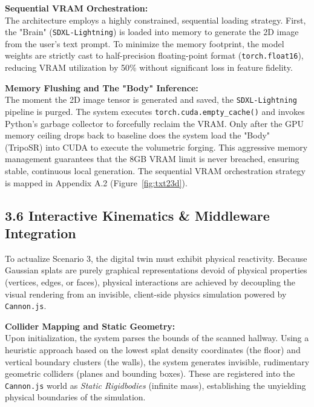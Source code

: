 \vspace{1em}
\textbf{Sequential VRAM Orchestration:} \\
The architecture employs a highly constrained, sequential loading strategy. First, the "Brain" (\texttt{SDXL-Lightning}) is loaded into memory to generate the 2D image from the user's text prompt. To minimize the memory footprint, the model weights are strictly cast to half-precision floating-point format (\texttt{torch.float16}), reducing VRAM utilization by 50\% without significant loss in feature fidelity. 

\vspace{1em}
\textbf{Memory Flushing and The "Body" Inference:} \\
The moment the 2D image tensor is generated and saved, the \texttt{SDXL-Lightning} pipeline is purged. The system executes \texttt{torch.cuda.empty\_cache()} and invokes Python's garbage collector to forcefully reclaim the VRAM. Only after the GPU memory ceiling drops back to baseline does the system load the "Body" (TripoSR) into CUDA to execute the volumetric forging. This aggressive memory management guarantees that the 8GB VRAM limit is never breached, ensuring stable, continuous local generation. The sequential VRAM orchestration strategy is mapped in Appendix A.2 (Figure~\ref{fig:txt23d}).

\vspace{0.3cm}
\subsection*{3.6 Interactive Kinematics \& Middleware Integration}
To actualize Scenario 3, the digital twin must exhibit physical reactivity. Because Gaussian splats are purely graphical representations devoid of physical properties (vertices, edges, or faces), physical interactions are achieved by decoupling the visual rendering from an invisible, client-side physics simulation powered by \texttt{Cannon.js}.

\vspace{0.2cm}
\textbf{Collider Mapping and Static Geometry:} \\
Upon initialization, the system parses the bounds of the scanned hallway. Using a heuristic approach based on the lowest splat density coordinates (the floor) and vertical boundary clusters (the walls), the system generates invisible, rudimentary geometric colliders (planes and bounding boxes). These are registered into the \texttt{Cannon.js} world as \textit{Static Rigidbodies} (infinite mass), establishing the unyielding physical boundaries of the simulation.


